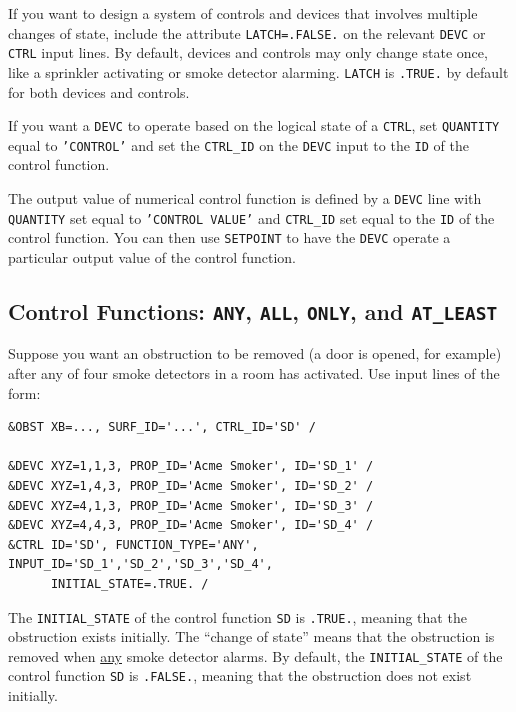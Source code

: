 \documentclass[11pt]{book}
\newcommand{\ct}{\tt\small}
\begin{document}
If you want to design a system of controls and devices that involves multiple changes of state,
include the attribute {\ct LATCH=.FALSE.} on the relevant {\ct DEVC} or {\ct CTRL} input lines.
By default, devices and controls may only change state once, like a sprinkler activating or
smoke detector alarming. {\ct LATCH} is {\ct .TRUE.} by default for both devices and controls.

If you want a {\ct DEVC} to operate based on the logical state of a {\ct CTRL}, set {\ct QUANTITY} equal to {\ct 'CONTROL'} and set the {\ct CTRL\_ID} on the {\ct DEVC} input to the {\ct ID} of the control function.

The output value of numerical control function is defined by a {\ct DEVC} line with {\ct QUANTITY} set equal to {\ct 'CONTROL VALUE'} and {\ct CTRL\_ID} set equal to the {\ct ID} of the control function.  You can then use {\ct SETPOINT} to have the {\ct DEVC} operate a particular output value of the control function.

\subsection{Control Functions: \texorpdfstring{{\tt ANY}}{ANY}, \texorpdfstring{{\tt ALL}}{ALL}, \texorpdfstring{{\tt ONLY}}{ONLY}, and
\texorpdfstring{{\tt AT\_LEAST}}{AT\_LEAST}}

\label{info:FUNCTION_TYPE}

Suppose you want an obstruction to be removed (a door is opened, for example) after any
of four smoke detectors in a room has activated. Use input lines of the form:

\footnotesize
\begin{verbatim}
&OBST XB=..., SURF_ID='...', CTRL_ID='SD' /

&DEVC XYZ=1,1,3, PROP_ID='Acme Smoker', ID='SD_1' /
&DEVC XYZ=1,4,3, PROP_ID='Acme Smoker', ID='SD_2' /
&DEVC XYZ=4,1,3, PROP_ID='Acme Smoker', ID='SD_3' /
&DEVC XYZ=4,4,3, PROP_ID='Acme Smoker', ID='SD_4' /
&CTRL ID='SD', FUNCTION_TYPE='ANY', INPUT_ID='SD_1','SD_2','SD_3','SD_4',
      INITIAL_STATE=.TRUE. /
\end{verbatim}
\normalsize

\noindent
The {\ct INITIAL\_STATE} of the control function {\ct SD} is {\ct .TRUE.},
meaning that the obstruction exists initially. The ``change of state'' means that the obstruction is
removed when \underline{any} smoke detector alarms.  By default, the {\ct INITIAL\_STATE}
of the control function {\ct SD} is {\ct .FALSE.}, meaning that the obstruction does not exist initially.
\end{document}
